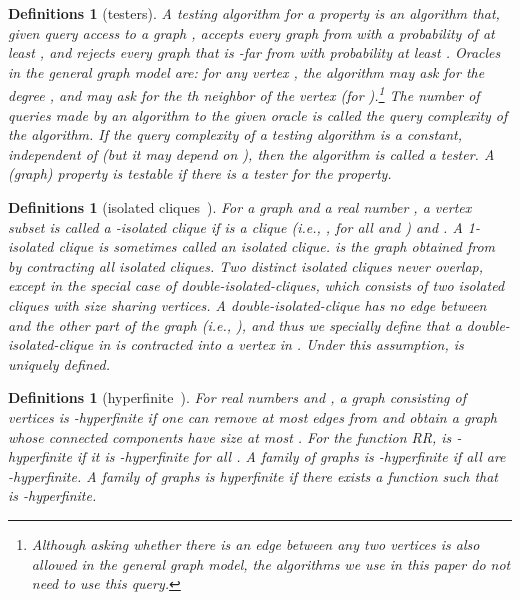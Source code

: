 \documentclass[11pt]{article}
\newtheorem{df}[thm]{Definitions}
\begin{document}
\begin{df}[testers]
A {\em testing algorithm} for a property  is an algorithm that, given query access 
to a graph , accepts every graph from  
with a probability of at least , and rejects every graph that is -far 
from  with probability at least . 
Oracles in the general graph model are: for any vertex , the algorithm may ask for the degree , and may ask for the th neighbor of the vertex (for ).\footnote{Although asking whether there is an edge between any two vertices is also allowed in the general graph model, the algorithms we use in this paper do not need to use this query.} 
The number of queries made by an algorithm to the given oracle is called 
the {\em query complexity} of the algorithm. 
If the query complexity of a testing algorithm is a constant, 
independent of  (but it may depend on ), 
then the algorithm is called a {\em tester}. 
A (graph) property is {\em testable} if there is a tester for the property. 
\end{df}







\begin{df}[isolated cliques~\cite{IsoClique_TALG09}]
For a graph  and a real number , 
a vertex subset  is called a {\em -isolated clique} 
if  is a clique (i.e., 
, for all  and ) 
and . 
A 1-isolated clique is sometimes called an {\em isolated clique}.
 is the graph obtained from  by contracting all isolated cliques. 
Two distinct isolated cliques never overlap, 
except in the special case of {\em double-isolated-cliques}, which consists 
of two isolated cliques with size  sharing  vertices.  
A double-isolated-clique  has no edge between  and the 
other part of the graph (i.e., ), and thus we specially define that a double-isolated-clique in  is contracted into  
a vertex in . 
Under this assumption,  is uniquely defined. 
\end{df}













\begin{df}[hyperfinite~\cite{hyperfinite}]
For real numbers  and , 
a graph  consisting of  vertices is {\em -hyperfinite} 
if one can remove at most  edges from  
and obtain a graph whose connected components have size at most . 
For the function RR, 
 is {\em -hyperfinite} 
if it is -hyperfinite for all . 
A family  of graphs is {\em -hyperfinite}  
if all  are -hyperfinite. 
A family  of graphs is {\em hyperfinite} 
if there exists a function  such that  is -hyperfinite. 
\end{df}
\end{document}
